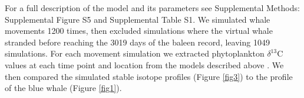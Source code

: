 \documentclass[a4paper,12pt]{article}
\begin{document}

For a full description of the model and its parameters see Supplemental Methods: Supplemental Figure S5 and Supplemental Table S1. 
We simulated whale movements 1200 times, then excluded simulations where the virtual whale stranded before reaching the 3019 days of the baleen record, leaving 1049 simulations.
For each movement simulation we extracted phytoplankton $\delta^{13}$C values at each time point and location from the models described above \cite{magozzi2017using}. 
We then compared the simulated stable isotope profiles (Figure \ref{fig3}) to the profile of the blue whale (Figure \ref{fig1}).
 
\end{document}
